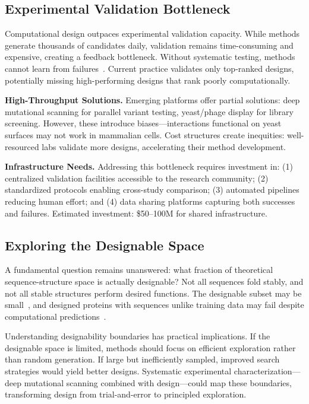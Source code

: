 \subsection{Experimental Validation Bottleneck}

Computational design outpaces experimental validation capacity. While methods generate thousands of candidates daily, validation remains time-consuming and expensive, creating a feedback bottleneck. Without systematic testing, methods cannot learn from failures~\cite{trepte2024ai}. Current practice validates only top-ranked designs, potentially missing high-performing designs that rank poorly computationally.

\textbf{High-Throughput Solutions.} Emerging platforms offer partial solutions: deep mutational scanning for parallel variant testing, yeast/phage display for library screening. However, these introduce biases---interactions functional on yeast surfaces may not work in mammalian cells. Cost structures create inequities: well-resourced labs validate more designs, accelerating their method development.

\textbf{Infrastructure Needs.} Addressing this bottleneck requires investment in: (1) centralized validation facilities accessible to the research community; (2) standardized protocols enabling cross-study comparison; (3) automated pipelines reducing human effort; and (4) data sharing platforms capturing both successes and failures. Estimated investment: \$50--100M for shared infrastructure.

\subsection{Exploring the Designable Space}

A fundamental question remains unanswered: what fraction of theoretical sequence-structure space is actually designable? Not all sequences fold stably, and not all stable structures perform desired functions. The designable subset may be small~\cite{ingraham2023chroma}, and designed proteins with sequences unlike training data may fail despite computational predictions~\cite{dauparas2022proteinmpnn}.

Understanding designability boundaries has practical implications. If the designable space is limited, methods should focus on efficient exploration rather than random generation. If large but inefficiently sampled, improved search strategies would yield better designs. Systematic experimental characterization---deep mutational scanning combined with design---could map these boundaries, transforming design from trial-and-error to principled exploration.

